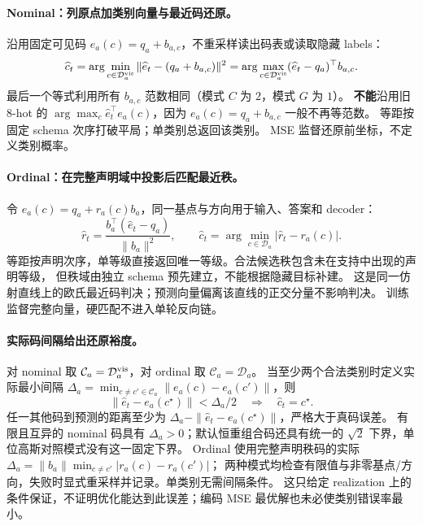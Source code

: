 \documentclass[11pt,UTF8,fontset=fandol]{ctexart}
\numberwithin{equation}{section}
\theoremstyle{definition}
\begin{document}
\paragraph{Nominal：列原点加类别向量与最近码还原。}
沿用固定可见码 $e_a(c)=q_a+b_{a,c}$，不重采样读出码表或读取隐藏 labels：
\begin{equation}
 \widehat c_t=\arg\min_{c\in\mathcal D_a^{\rm vis}}
 \|\widehat e_t-(q_a+b_{a,c})\|^2
 =\arg\max_{c\in\mathcal D_a^{\rm vis}}(\widehat e_t-q_a)^\top b_{a,c}.
 \label{eq:R:nearest-code}
\end{equation}
最后一个等式利用所有 $b_{a,c}$ 范数相同（模式 $C$ 为 $2$，模式 $G$ 为 $1$）。
\textbf{不能}沿用旧 8-hot 的 $\arg\max_c\widehat e_t^\top e_a(c)$，因为 $e_a(c)=q_a+b_{a,c}$ 一般不再等范数。
等距按固定 schema 次序打破平局；单类别总返回该类别。
MSE 监督还原前坐标，不定义类别概率。

\paragraph{Ordinal：在完整声明域中投影后匹配最近秩。}
令 $e_a(c)=q_a+r_a(c)b_a$，同一基点与方向用于输入、答案和 decoder：
\begin{equation}
 \widehat r_t=\frac{b_a^\top(\widehat e_t-q_a)}{\|b_a\|^2},\qquad
 \boxed{\widehat c_t=\arg\min_{c\in\mathcal D_a}
 \left|\widehat r_t-r_a(c)\right|.}
 \label{v53c:eq:ordinal-decode}
\end{equation}
等距按声明次序，单等级直接返回唯一等级。合法候选秩包含未在支持中出现的声明等级，
但秩域由独立 schema 预先建立，不能根据隐藏目标补建。
这是同一仿射直线上的欧氏最近码判决；预测向量偏离该直线的正交分量不影响判决。
训练监督完整向量，硬匹配不进入单轮反向链。

\paragraph{实际码间隔给出还原裕度。}
对 nominal 取 $\mathcal C_a=\mathcal D_a^{\rm vis}$，对 ordinal 取 $\mathcal C_a=\mathcal D_a$。
当至少两个合法类别时定义实际最小间隔
$\Delta_a=\min_{c\ne c'\in\mathcal C_a}\|e_a(c)-e_a(c')\|$，则
\begin{equation}
 \boxed{\|\widehat e_t-e_a(c^\star)\|<\Delta_a/2
 \quad\Longrightarrow\quad\widehat c_t=c^\star.}
 \label{eq:R:code-recovery-margin}
\end{equation}
任一其他码到预测的距离至少为 $\Delta_a-\|\widehat e_t-e_a(c^\star)\|$，严格大于真码误差。
有限且互异的 nominal 码具有 $\Delta_a>0$；默认恒重组合码还具有统一的 $\sqrt2$ 下界，单位高斯对照模式没有这一固定下界。
Ordinal 使用完整声明秩码的实际 $\Delta_a=\|b_a\|\min_{c\ne c'}|r_a(c)-r_a(c')|$；
两种模式均检查有限值与非零基点/方向，失败时显式重采样并记录。单类别无需间隔条件。
这只给定 realization 上的条件保证，不证明优化能达到此误差；编码 MSE 最优解也未必使类别错误率最小。
\end{document}
